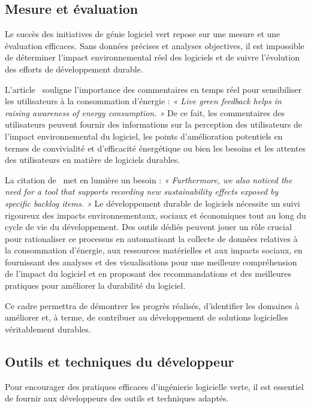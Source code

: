 \subsection{Mesure et évaluation}
Le succès des initiatives de génie logiciel vert repose sur une mesure et une évaluation efficaces. Sans données précises et analyses objectives, il est impossible de déterminer l'impact environnemental réel des logiciels et de suivre l'évolution des efforts de développement durable.


L'article~\cite{ImpactGreenFeedback} souligne l'importance des commentaires en temps réel pour sensibiliser les utilisateurs à la consommation d'énergie : \emph{« Live green feedback helps in raising awareness of energy consumption. »} De ce fait, les commentaires des utilisateurs peuvent fournir des informations sur la perception des utilisateurs de l'impact environnemental du logiciel, les points d'amélioration potentiels en termes de convivialité et d'efficacité énergétique ou bien les besoins et les attentes des utilisateurs en matière de logiciels durables.


La citation de~\cite{SustainabilityAwarenessFramework} met en lumière un besoin : \emph{« Furthermore, we also noticed the need for a tool that supports recording new sustainability effects exposed by specific backlog items. »} Le développement durable de logiciels nécessite un suivi rigoureux des impacts environnementaux, sociaux et économiques tout au long du cycle de vie du développement. Des outils dédiés peuvent jouer un rôle crucial pour rationaliser ce processus en automatisant la collecte de données relatives à la consommation d'énergie, aux ressources matérielles et aux impacts sociaux, en fournissant des analyses et des visualisations pour une meilleure compréhension de l'impact du logiciel et en proposant des recommandations et des meilleures pratiques pour améliorer la durabilité du logiciel.


Ce cadre permettra de démontrer les progrès réalisés, d'identifier les domaines à améliorer et, à terme, de contribuer au développement de solutions logicielles véritablement durables.


\subsection{Outils et techniques du développeur}
Pour encourager des pratiques efficaces d'ingénierie logicielle verte, il est essentiel de fournir aux développeurs des outils et techniques adaptés.

